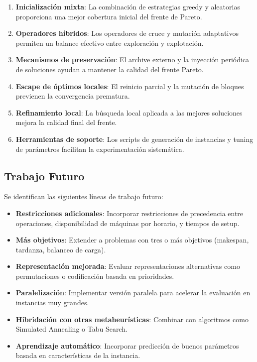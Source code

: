 \documentclass[preprint,12pt,authoryear]{elsarticle}
\begin{document}
\begin{enumerate}
    \item \textbf{Inicialización mixta}: La combinación de estrategias greedy y aleatorias proporciona una mejor cobertura inicial del frente de Pareto.
    
    \item \textbf{Operadores híbridos}: Los operadores de cruce y mutación adaptativos permiten un balance efectivo entre exploración y explotación.
    
    \item \textbf{Mecanismos de preservación}: El archive externo y la inyección periódica de soluciones ayudan a mantener la calidad del frente Pareto.
    
    \item \textbf{Escape de óptimos locales}: El reinicio parcial y la mutación de bloques previenen la convergencia prematura.
    
    \item \textbf{Refinamiento local}: La búsqueda local aplicada a las mejores soluciones mejora la calidad final del frente.
    
    \item \textbf{Herramientas de soporte}: Los scripts de generación de instancias y tuning de parámetros facilitan la experimentación sistemática.
\end{enumerate}

\subsection{Trabajo Futuro}

Se identifican las siguientes líneas de trabajo futuro:

\begin{itemize}
    \item \textbf{Restricciones adicionales}: Incorporar restricciones de precedencia entre operaciones, disponibilidad de máquinas por horario, y tiempos de setup.
    
    \item \textbf{Más objetivos}: Extender a problemas con tres o más objetivos (makespan, tardanza, balanceo de carga).
    
    \item \textbf{Representación mejorada}: Evaluar representaciones alternativas como permutaciones o codificación basada en prioridades.
    
    \item \textbf{Paralelización}: Implementar versión paralela para acelerar la evaluación en instancias muy grandes.
    
    \item \textbf{Hibridación con otras metaheurísticas}: Combinar con algoritmos como Simulated Annealing o Tabu Search.
    
    \item \textbf{Aprendizaje automático}: Incorporar predicción de buenos parámetros basada en características de la instancia.
\end{itemize}
\end{document}
